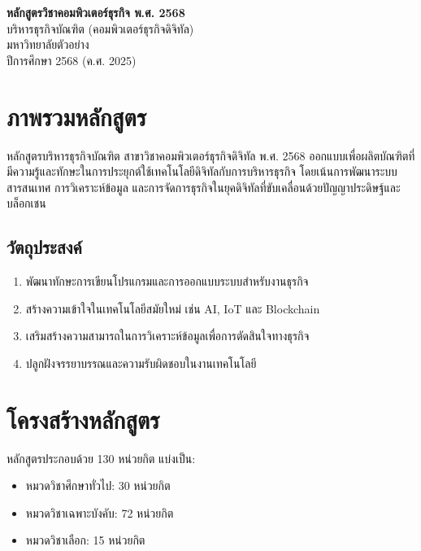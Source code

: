 \documentclass[a4paper,12pt]{article}
\begin{document}
\begin{titlepage}
    \centering
    \vspace*{2cm}
    {\Huge\bfseries หลักสูตรวิชาคอมพิวเตอร์ธุรกิจ พ.ศ. 2568\\}
    \vspace{1cm}
    {\Large บริหารธุรกิจบัณฑิต (คอมพิวเตอร์ธุรกิจดิจิทัล)\\}
    \vspace{0.5cm}
    {\large มหาวิทยาลัยตัวอย่าง\\}
    \vspace{2cm}
    {\large ปีการศึกษา 2568 (ค.ศ. 2025)\\}
    \vfill
\end{titlepage}

\tableofcontents
\newpage

\section{ภาพรวมหลักสูตร}
หลักสูตรบริหารธุรกิจบัณฑิต สาขาวิชาคอมพิวเตอร์ธุรกิจดิจิทัล พ.ศ. 2568 ออกแบบเพื่อผลิตบัณฑิตที่มีความรู้และทักษะในการประยุกต์ใช้เทคโนโลยีดิจิทัลกับการบริหารธุรกิจ โดยเน้นการพัฒนาระบบสารสนเทศ การวิเคราะห์ข้อมูล และการจัดการธุรกิจในยุคดิจิทัลที่ขับเคลื่อนด้วยปัญญาประดิษฐ์และบล็อกเชน

\subsection{วัตถุประสงค์}
\begin{enumerate}
    \item พัฒนาทักษะการเขียนโปรแกรมและการออกแบบระบบสำหรับงานธุรกิจ
    \item สร้างความเข้าใจในเทคโนโลยีสมัยใหม่ เช่น AI, IoT และ Blockchain
    \item เสริมสร้างความสามารถในการวิเคราะห์ข้อมูลเพื่อการตัดสินใจทางธุรกิจ
    \item ปลูกฝังจรรยาบรรณและความรับผิดชอบในงานเทคโนโลยี
\end{enumerate}

\section{โครงสร้างหลักสูตร}
หลักสูตรประกอบด้วย 130 หน่วยกิต แบ่งเป็น:
\begin{itemize}
    \item หมวดวิชาศึกษาทั่วไป: 30 หน่วยกิต
    \item หมวดวิชาเฉพาะบังคับ: 72 หน่วยกิต
    \item หมวดวิชาเลือก: 15 หน่วยกิต
\end{itemize}
\end{document}
